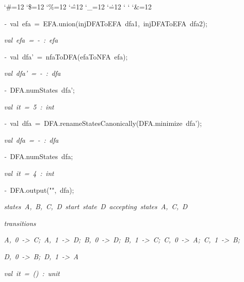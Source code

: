 \begin{list}{}
{\setlength{\leftmargin}{\leftmargini}
\setlength{\rightmargin}{0cm}
\setlength{\itemindent}{0cm}
\setlength{\listparindent}{0cm}
\setlength{\itemsep}{0cm}
\setlength{\parsep}{0cm}
\setlength{\labelsep}{0cm}
\setlength{\labelwidth}{0cm}
\catcode`\#=12
\catcode`\$=12
\catcode`\%=12
\catcode`\^=12
\catcode`\_=12
\catcode`\.=12
\catcode`
\catcode`
\catcode`\&=12
\ttfamily}
\small
\item[]\textsl{-\ }val\ efa\ =\ EFA.union(injDFAToEFA\ dfa1,\ injDFAToEFA\ dfa2);
\item[]\textsl{val\ efa\ =\ -\ :\ efa}
\item[]\textsl{-\ }val\ dfa'\ =\ nfaToDFA(efaToNFA\ efa);
\item[]\textsl{val\ dfa'\ =\ -\ :\ dfa}
\item[]\textsl{-\ }DFA.numStates\ dfa';
\item[]\textsl{val\ it\ =\ 5\ :\ int}
\item[]\textsl{-\ }val\ dfa\ =\ DFA.renameStatesCanonically(DFA.minimize\ dfa');
\item[]\textsl{val\ dfa\ =\ -\ :\ dfa}
\item[]\textsl{-\ }DFA.numStates\ dfa;
\item[]\textsl{val\ it\ =\ 4\ :\ int}
\item[]\textsl{-\ }DFA.output("",\ dfa);
\item[]\textsl{states\ A,\ B,\ C,\ D\ start\ state\ D\ accepting\ states\ A,\ C,\ D}
\item[]\textsl{transitions}
\item[]\textsl{A,\ 0\ ->\ C;\ A,\ 1\ ->\ D;\ B,\ 0\ ->\ D;\ B,\ 1\ ->\ C;\ C,\ 0\ ->\ A;\ C,\ 1\ ->\ B;}
\item[]\textsl{D,\ 0\ ->\ B;\ D,\ 1\ ->\ A}
\item[]\textsl{val\ it\ =\ ()\ :\ unit}
\end{list}
